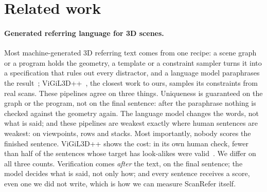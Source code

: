 \section{Related work}
\label{sec:related}

\paragraph{Generated referring language for 3D scenes.}
Most machine-generated 3D referring text comes from one recipe: a scene graph or a program holds the geometry, a template or a constraint sampler turns it into a specification that rules out every distractor, and a language model paraphrases the result~\cite{referit3d,sceneverse,3dgrand,disc3d,clevr3dderef,clevrrefplus}; ViGiL3D++~\cite{vigil3d,vigil3dpp}, the closest work to ours, samples its constraints from real scans. These pipelines agree on three things. Uniqueness is guaranteed on the graph or the program, not on the final sentence: after the paraphrase nothing is checked against the geometry again. The language model changes the words, not what is said; and these pipelines are weakest exactly where human sentences are weakest: on viewpoints, rows and stacks. Most importantly, nobody scores the finished sentence. ViGiL3D++ shows the cost: in its own human check, fewer than half of the sentences whose target has look-alikes were valid~\cite{vigil3dpp}. We differ on all three counts. Verification comes \emph{after} the text, on the final sentence; the model decides what is said, not only how; and every sentence receives a score, even one we did not write, which is how we can measure ScanRefer itself.

